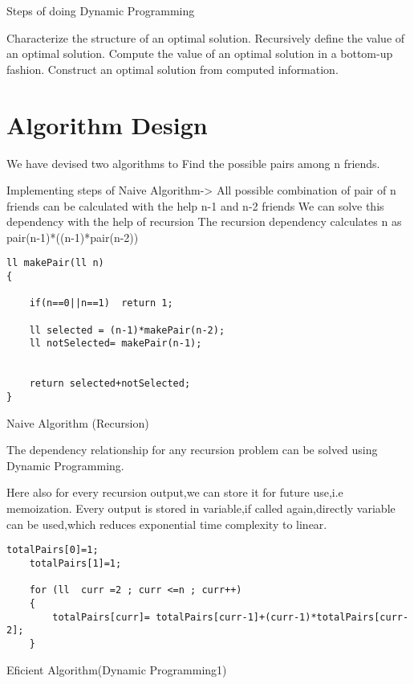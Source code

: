 \documentclass[conference]{IEEEtran}
\begin{document}
Steps of doing Dynamic Programming

Characterize the structure of an optimal solution.
Recursively define the value of an optimal solution.
Compute the value of an optimal solution in a bottom-up fashion.
Construct an optimal solution from computed information.

\section{Algorithm Design}
We have devised two algorithms to Find the possible pairs among n friends.

Implementing steps of Naive Algorithm-> 
All possible combination of pair of n friends can be calculated with
the help n-1 and n-2 friends
We can solve this dependency with the help of recursion
The recursion dependency calculates n as pair(n-1)*((n-1)*pair(n-2))


\bigskip

\begin{algorithm}[H]
\begin{lstlisting}
ll makePair(ll n)
{

    if(n==0||n==1)  return 1;

    ll selected = (n-1)*makePair(n-2);
    ll notSelected= makePair(n-1);


    return selected+notSelected;
}

\end{lstlisting}

 \caption{Naive Algorithm (Recursion) }
\end{algorithm}

\bigskip
The dependency relationship for any recursion problem can be solved 
using Dynamic Programming.

\newline Here also for every recursion output,we can store it for future use,i.e memoization.
\newline Every output is stored in variable,if called again,directly variable can be used,which reduces
exponential time complexity to linear.

\bigskip

\begin{algorithm}[H]
\begin{lstlisting}
totalPairs[0]=1;
    totalPairs[1]=1;

    for (ll  curr =2 ; curr <=n ; curr++)
    {
        totalPairs[curr]= totalPairs[curr-1]+(curr-1)*totalPairs[curr-2];
    }
\end{lstlisting}

 \caption{Eficient Algorithm(Dynamic Programming1)}
\end{algorithm}
\bigskip
\end{document}
